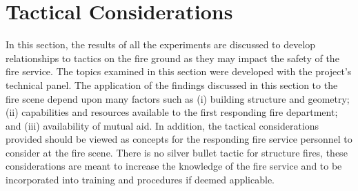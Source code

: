 \documentclass[12pt,oneside]{book}
\begin{document}

\clearpage

\chapter{Tactical Considerations}

In this section, the results of all the experiments are discussed to develop relationships to tactics on the fire ground as they may impact the safety of the fire service. The topics examined in this section were developed with the project's technical panel. The application of the findings discussed in this section to the fire scene depend upon many factors such as (i) building structure and geometry; (ii) capabilities and resources available to the first responding fire department; and (iii) availability of mutual aid. In addition, the tactical considerations provided should be viewed as concepts for the responding fire service personnel to consider at the fire scene. There is no silver bullet tactic for structure fires, these considerations are meant to increase the knowledge of the fire service and to be incorporated into training and procedures if deemed applicable. 
\end{document}
